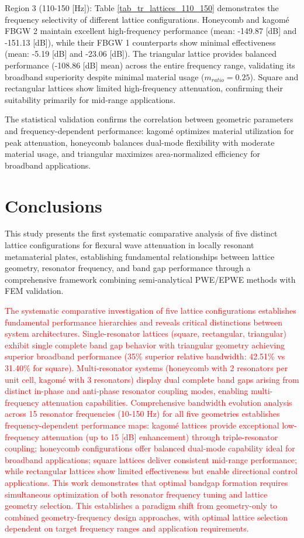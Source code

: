 \documentclass[review,numbers,sort&compress]{elsarticle}
\begin{document}
Region 3 (110-150 [Hz]): Table \ref{tab_tr_lattices_110_150} demonstrates the frequency selectivity of different lattice configurations. Honeycomb and kagomé FBGW 2 maintain excellent high-frequency performance (mean: -149.87 [dB] and -151.13 [dB]), while their FBGW 1 counterparts show minimal effectiveness (mean: -5.19 [dB] and -23.06 [dB]). The triangular lattice provides balanced performance (-108.86 [dB] mean) across the entire frequency range, validating its broadband superiority despite minimal material usage ($m_{ratio} = 0.25$). Square and rectangular lattices show limited high-frequency attenuation, confirming their suitability primarily for mid-range applications.

The statistical validation confirms the correlation between geometric parameters and frequency-dependent performance: kagomé optimizes material utilization for peak attenuation, honeycomb balances dual-mode flexibility with moderate material usage, and triangular maximizes area-normalized efficiency for broadband applications.

\section{Conclusions}\label{Conc}

This study presents the first systematic comparative analysis of five distinct lattice configurations for flexural wave attenuation in locally resonant metamaterial plates, establishing fundamental relationships between lattice geometry, resonator frequency, and band gap performance through a comprehensive framework combining semi-analytical PWE/EPWE methods with FEM validation.

\textcolor{red}{The systematic comparative investigation of five lattice configurations establishes fundamental performance hierarchies and reveals critical distinctions between system architectures. Single-resonator lattices (square, rectangular, triangular) exhibit single complete band gap behavior with triangular geometry achieving superior broadband performance (35\% superior relative bandwidth: 42.51\% vs 31.40\% for square). Multi-resonator systems (honeycomb with 2 resonators per unit cell, kagomé with 3 resonators) display dual complete band gaps arising from distinct in-phase and anti-phase resonator coupling modes, enabling multi-frequency attenuation capabilities. Comprehensive bandwidth evolution analysis across 15 resonator frequencies (10-150 Hz) for all five geometries establishes frequency-dependent performance maps: kagomé lattices provide exceptional low-frequency attenuation (up to 15 [dB] enhancement) through triple-resonator coupling; honeycomb configurations offer balanced dual-mode capability ideal for broadband applications; square lattices deliver consistent mid-range performance; while rectangular lattices show limited effectiveness but enable directional control applications. This work demonstrates that optimal bandgap formation requires simultaneous optimization of both resonator frequency tuning and lattice geometry selection. This establishes a paradigm shift from geometry-only to combined geometry-frequency design approaches, with optimal lattice selection dependent on target frequency ranges and application requirements.}
\end{document}
